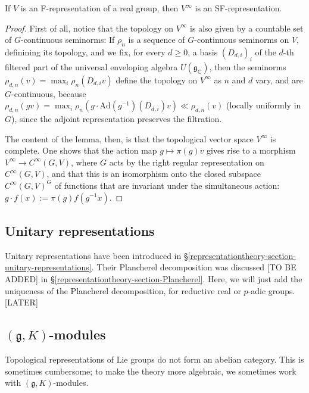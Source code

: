 \begin{lemma}
 \label{lemma-smooth-vectors-Frepresentation}
If $V$ is an F-representation of a real group, then $V^\infty$ is an SF-representation.
\end{lemma}

\begin{proof}
First of all, notice that the topology on $V^\infty$ is also given by a countable set of $G$-continuous seminorms: If $\rho_n$ is a sequence of $G$-continuous seminorms on $V$, definining its topology, and we fix, for every $d\ge 0$, a basis $(D_{d,i})_i$ of the $d$-th filtered part of the universal enveloping algebra $U(\mathfrak g_{\mathbb C})$, then the seminorms $\rho_{d,n}(v) = \max_i \rho_n (D_{d,i}v)$ define the topology on $V^\infty$ as $n$ and $d$ vary, and are $G$-continuous, because $\rho_{d,n}(gv) = \max_i \rho_n (g \cdot \text{Ad}(g^{-1})(D_{d,i}) v) \ll \rho_{d,n}(v)$ (locally uniformly in $G$), since the adjoint representation preserves the filtration. 


The content of the lemma, then, is that the topological vector space $V^\infty$ is complete. One shows that the action map $g\mapsto \pi(g) v$ gives rise to a morphism $V^\infty \to C^\infty(G, V)$, where $G$ acts by the right regular representation on $C^\infty(G, V)$, and that this is an isomorphism onto the closed subspace $C^\infty(G, V)^G$ of functions that are invariant under the simultaneous action: $g\cdot f (x) := \pi(g) f(g^{-1} x)$. 
\end{proof}

\subsection{Unitary representations}
\label{subsection-unitary-representations}

Unitary representations have been introduced in \S \ref{representationtheory-section-unitary-representations}. Their Plancherel decomposition was discussed [TO BE ADDED] in \S \ref{representationtheory-section-Plancherel}. Here, we will just add the uniqueness of the Plancherel decomposition, for reductive real or $p$-adic groups. [LATER]


\subsection{$(\mathfrak g, K)$-modules}
\label{subsection-gK-modules}

Topological representations of Lie groups do not form an abelian category. This is sometimes cumbersome; to make the theory more algebraic, we sometimes work with $(\mathfrak g,K)$-modules. 

